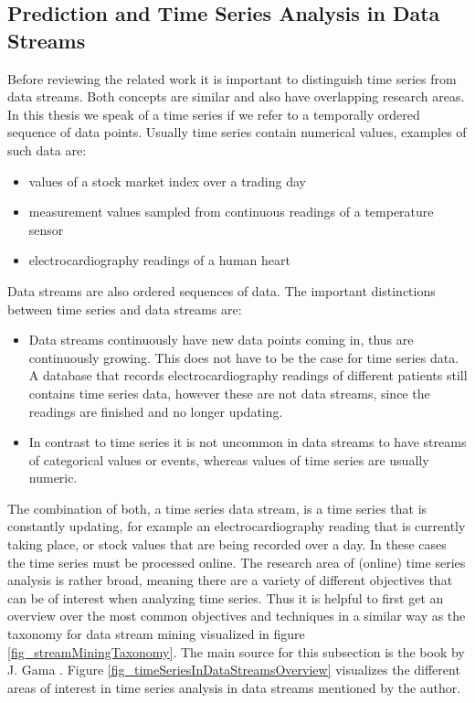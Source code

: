 \subsection{Prediction and Time Series Analysis in Data Streams}
\label{subsec_timeSeriesAnalysis}

Before reviewing the related work it is important to distinguish time series from data streams. Both concepts are similar and also have overlapping research areas. In this thesis we speak of a time series if we refer to a temporally ordered sequence of data points. Usually time series contain numerical values, examples of such data are:

\begin{itemize}
	\item values of a stock market index over a trading day
	\item measurement values sampled from continuous readings of a temperature sensor
	\item electrocardiography readings of a human heart
\end{itemize}

Data streams are also ordered sequences of data. The important distinctions between time series and data streams are: 

\begin{itemize}
	\item Data streams continuously have new data points coming in, thus are continuously growing. This does not have to be the case for time series data. A database that records electrocardiography readings of different patients still contains time series data, however these are not data streams, since the readings are finished and no longer updating.
	\item In contrast to time series it is not uncommon in data streams to have streams of categorical values or events, whereas values of time series are usually numeric.
\end{itemize}


The combination of both, a time series data stream, is a time series that is constantly updating, for example an electrocardiography reading that is currently taking place, or stock values that are being recorded over a day. In these cases the time series must be processed online. \newline
The research area of (online) time series analysis is rather broad, meaning there are a variety of different objectives that can be of interest when analyzing time series. Thus it is helpful to first get an overview over the most common objectives and techniques in a similar way as the taxonomy for data stream mining visualized in figure \ref{fig_streamMiningTaxonomy}. The main source for this subsection is the book by J. Gama \cite{gama2010knowledge}. Figure \ref{fig_timeSeriesInDataStreamsOverview} visualizes the different areas of interest in time series analysis in data streams mentioned by the author.

